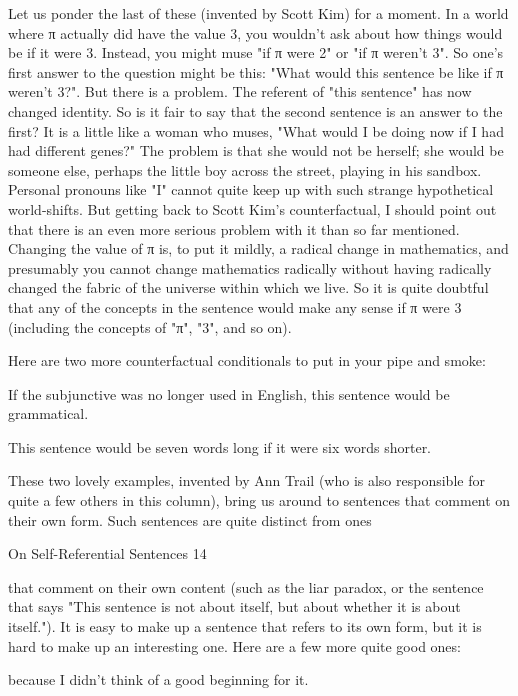         Let us ponder the last of these (invented by Scott Kim) for a moment. In a world
where π actually did have the value 3, you wouldn't ask about how things would be if it
were 3. Instead, you might muse "if π were 2" or "if π weren't 3". So one's first answer to
the question might be this: "What would this sentence be like if π weren't 3?". But there
is a problem. The referent of "this sentence" has now changed identity. So is it fair to say
that the second sentence is an answer to the first? It is a little like a woman who muses,
"What would I be doing now if I had had different genes?" The problem is that she would
not be herself; she would be someone else, perhaps the little boy across the street, playing
in his sandbox. Personal pronouns like "I" cannot quite keep up with such strange
hypothetical world-shifts.
        But getting back to Scott Kim's counterfactual, I should point out that there is an
even more serious problem with it than so far mentioned. Changing the value of π is, to
put it mildly, a radical change in mathematics, and presumably you cannot change
mathematics radically without having radically changed the fabric of the universe within
which we live. So it is quite doubtful that any of the concepts in the sentence would make
any sense if π were 3 (including the concepts of "π", "3", and so on).

       Here are two more counterfactual conditionals to put in your pipe and smoke:

   If the subjunctive was no longer used in English, this sentence would be
      grammatical.

This sentence would be seven words long if it were six words shorter.

These two lovely examples, invented by Ann Trail (who is also responsible for quite a
few others in this column), bring us around to sentences that comment on their own form.
Such sentences are quite distinct from ones




On Self-Referential Sentences                                                               14

that comment on their own content (such as the liar paradox, or the sentence that says
"This sentence is not about itself, but about whether it is about itself."). It is easy to make
up a sentence that refers to its own form, but it is hard to make up an interesting one.
Here are a few more quite good ones:

       because I didn't think of a good beginning for it.

